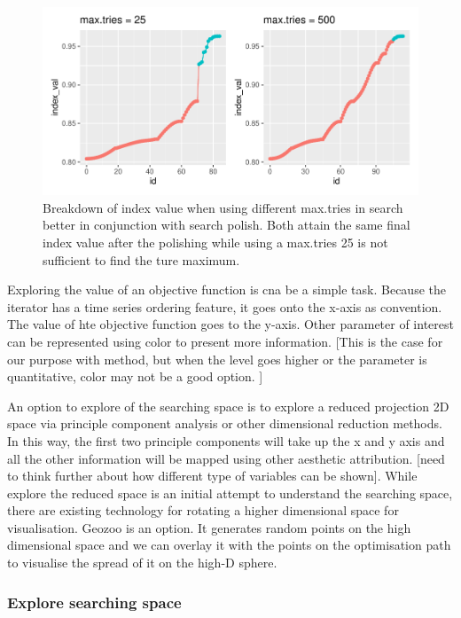 \documentclass[12pt]{article}
\begin{document}
\begin{figure}
\centering
\includegraphics{paper_files/figure-latex/polish-1.pdf}
\caption{\label{trace-compare}Breakdown of index value when using
different max.tries in search better in conjunction with search polish.
Both attain the same final index value after the polishing while using a
max.tries 25 is not sufficient to find the ture maximum.}
\end{figure}

Exploring the value of an objective function is cna be a simple task.
Because the iterator has a time series ordering feature, it goes onto
the x-axis as convention. The value of hte objective function goes to
the y-axis. Other parameter of interest can be represented using color
to present more information. {[}This is the case for our purpose with
method, but when the level goes higher or the parameter is quantitative,
color may not be a good option. {]}

An option to explore of the searching space is to explore a reduced
projection 2D space via principle component analysis or other
dimensional reduction methods. In this way, the first two principle
components will take up the x and y axis and all the other information
will be mapped using other aesthetic attribution. {[}need to think
further about how different type of variables can be shown{]}. While
explore the reduced space is an initial attempt to understand the
searching space, there are existing technology for rotating a higher
dimensional space for visualisation. Geozoo is an option. It generates
random points on the high dimensional space and we can overlay it with
the points on the optimisation path to visualise the spread of it on the
high-D sphere.

\hypertarget{animated}{%
\subsubsection{Explore searching space}\label{animated}}
\end{document}
